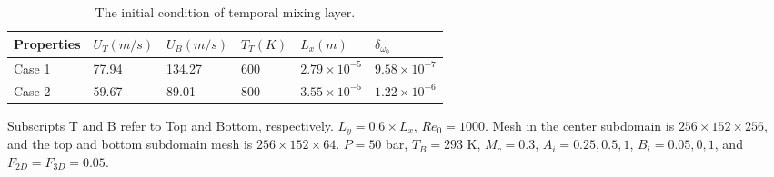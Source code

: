       

\begin{table}
    \caption{The initial condition of temporal mixing layer.}\label{TML_init_table}
    \begin{threeparttable} 
\begin{tabular*}{0.8\textwidth}{@{} l|lllll@{}}
    \toprule
    Properties     & $U_T (m/s)$   & $U_B (m/s)$  & $T_T (K)$   & $L_x (m)$ & $\delta_{\omega_0}$\\
    \midrule
    Case 1         & 77.94         & 134.27       & 600         & $2.79 \times 10^{-5}$   & $9.58 \times 10^{-7}$   \\
    Case 2         & 59.67         & 89.01        & 800         & $3.55 \times 10^{-5}$   & $1.22\times 10^{-6}$    \\
    \bottomrule
\end{tabular*}
\begin{tablenotes}
    \footnotesize    
    \item Subscripts T and B refer to Top and Bottom, respectively. $L_y = 0.6\times L_x$,  $Re_0=1000$. Mesh in the center subdomain is $256\times 152 \times 256$, and the top and bottom subdomain mesh is $256\times 152\times 64$. $P = 50$ bar, $T_B=293$ K, $M_c = 0.3$, $A_i = 0.25, 0.5, 1$, $B_i = 0.05, 0, 1$, and $F_{2D}= F_{3D} = 0.05$.\\
  \end{tablenotes}
\end{threeparttable}
\end{table}




